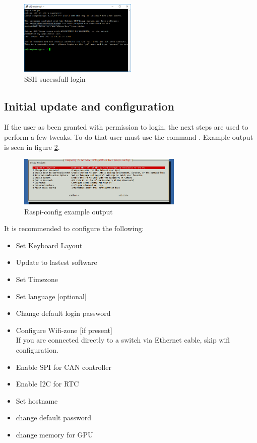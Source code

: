 \begin{figure}[!h]
	\centering
	\includegraphics[trim={0 3cm 0 0}, clip, width=0.5\textwidth]{figures/ssh_sucessfull.png}
	\caption{SSH sucessfull login}
	\label{fig:ssh_successfull}
\end{figure}

\subsection{Initial update and configuration}
If the user as been granted with permission to login, the next steps are used to perform a few tweaks.
To do that user must use the command . Example output is seen in figure \ref{fig:raspi_config}.

\begin{figure}[!hb]
	\centering
	\includegraphics[width=0.7\textwidth]{figures/raspi-config}
	\caption{Raspi-config example output}
	\label{fig:raspi_config}
\end{figure}

It is recommended to configure the following:

\begin{itemize}
	\tightlist
	\item Set Keyboard Layout
	\item Update to lastest software
	\item Set Timezone
	\item Set language [optional]
	\item Change default login password
	\item Configure Wifi-zone [if present]\\
	\colorbox{red!15}{If you are connected directly to a switch via Ethernet cable, skip wifi configuration.}
	\item Enable \gls{SPI} for \gls{CAN} controller
	\item Enable \gls{I2C} for RTC
	\item Set hostname
	\item change default password
	\item change memory for GPU
\end{itemize}




